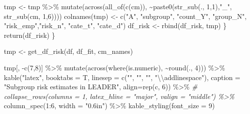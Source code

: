 \documentclass[
]{article}
\newenvironment{Shaded}{\begin{snugshade}}{\end{snugshade}}
\newcommand{\AttributeTok}[1]{\textcolor[rgb]{0.77,0.63,0.00}{#1}}
\newcommand{\CommentTok}[1]{\textcolor[rgb]{0.56,0.35,0.01}{\textit{#1}}}
\newcommand{\DecValTok}[1]{\textcolor[rgb]{0.00,0.00,0.81}{#1}}
\newcommand{\FunctionTok}[1]{\textcolor[rgb]{0.00,0.00,0.00}{#1}}
\newcommand{\NormalTok}[1]{#1}
\newcommand{\OtherTok}[1]{\textcolor[rgb]{0.56,0.35,0.01}{#1}}
\newcommand{\SpecialCharTok}[1]{\textcolor[rgb]{0.00,0.00,0.00}{#1}}
\newcommand{\StringTok}[1]{\textcolor[rgb]{0.31,0.60,0.02}{#1}}
\begin{document}
\begin{Shaded}
\begin{Highlighting}[]
\NormalTok{    tmp }\OtherTok{\textless{}{-}}\NormalTok{ tmp }\SpecialCharTok{\%\textgreater{}\%} \FunctionTok{mutate}\NormalTok{(}\FunctionTok{across}\NormalTok{(}\FunctionTok{all\_of}\NormalTok{(}\FunctionTok{c}\NormalTok{(cm)), }\SpecialCharTok{\textasciitilde{}}\FunctionTok{paste0}\NormalTok{(}\FunctionTok{str\_sub}\NormalTok{(., }\DecValTok{1}\NormalTok{,}\DecValTok{1}\NormalTok{),}\StringTok{"\_"}\NormalTok{, }\FunctionTok{str\_sub}\NormalTok{(cm, }\DecValTok{1}\NormalTok{,}\DecValTok{6}\NormalTok{)))) }
    \FunctionTok{colnames}\NormalTok{(tmp) }\OtherTok{\textless{}{-}} \FunctionTok{c}\NormalTok{(}\StringTok{"A"}\NormalTok{, }\StringTok{"subgroup"}\NormalTok{, }\StringTok{"count\_Y"}\NormalTok{, }\StringTok{"group\_N"}\NormalTok{, }
                      \StringTok{"risk\_emp"}\NormalTok{,}\StringTok{"risk\_n"}\NormalTok{, }\StringTok{"cate\_t"}\NormalTok{, }\StringTok{"cate\_d"}\NormalTok{)}
\NormalTok{    df\_risk }\OtherTok{\textless{}{-}} \FunctionTok{rbind}\NormalTok{(df\_risk, tmp)}
\NormalTok{  \}}
  \FunctionTok{return}\NormalTok{(df\_risk)}
\NormalTok{\}}

\NormalTok{tmp }\OtherTok{\textless{}{-}} \FunctionTok{get\_df\_risk}\NormalTok{(df, df\_fit, cm\_names)}
\end{Highlighting}
\end{Shaded}

\begin{Shaded}
\begin{Highlighting}[]
\NormalTok{tmp[, }\SpecialCharTok{{-}}\FunctionTok{c}\NormalTok{(}\DecValTok{7}\NormalTok{,}\DecValTok{8}\NormalTok{)] }\SpecialCharTok{\%\textgreater{}\%} 
  \FunctionTok{mutate}\NormalTok{(}\FunctionTok{across}\NormalTok{(}\FunctionTok{where}\NormalTok{(is.numeric), }\SpecialCharTok{\textasciitilde{}}\FunctionTok{round}\NormalTok{(., }\DecValTok{4}\NormalTok{))) }\SpecialCharTok{\%\textgreater{}\%} 
  \FunctionTok{kable}\NormalTok{(}\StringTok{"latex"}\NormalTok{, }\AttributeTok{booktabs =}\NormalTok{ T, }\AttributeTok{linesep =} \FunctionTok{c}\NormalTok{(}\StringTok{""}\NormalTok{, }\StringTok{""}\NormalTok{, }\StringTok{""}\NormalTok{, }\StringTok{"}\SpecialCharTok{\textbackslash{}\textbackslash{}}\StringTok{addlinespace"}\NormalTok{),}
        \AttributeTok{caption =} \StringTok{"Subgroup risk estimates in LEADER"}\NormalTok{, }\AttributeTok{align=}\FunctionTok{rep}\NormalTok{(}\StringTok{\textquotesingle{}c\textquotesingle{}}\NormalTok{, }\DecValTok{6}\NormalTok{)) }\SpecialCharTok{\%\textgreater{}\%} 
  \CommentTok{\# collapse\_rows(columns = 1, latex\_hline = "major", valign = "middle") \%\textgreater{}\%}
  \FunctionTok{column\_spec}\NormalTok{(}\DecValTok{1}\SpecialCharTok{:}\DecValTok{6}\NormalTok{, }\AttributeTok{width =} \StringTok{"0.6in"}\NormalTok{) }\SpecialCharTok{\%\textgreater{}\%} 
  \FunctionTok{kable\_styling}\NormalTok{(}\AttributeTok{font\_size =} \DecValTok{9}\NormalTok{)}
\end{Highlighting}
\end{Shaded}
\end{document}
